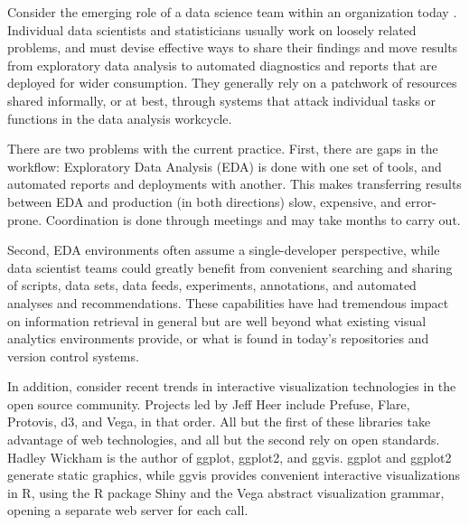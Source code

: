

\maketitle


Consider the emerging role of a data science team within an
organization today \cite{Keim:2008:VAS}.
%
Individual data scientists and statisticians usually work on loosely
related problems, and must devise effective ways to share their findings
and move results from exploratory data analysis to automated diagnostics
and reports that are deployed for wider consumption.
They generally rely on a patchwork of resources shared informally,
or at best, through systems that attack individual tasks or functions
in the data analysis workcycle. %

There are two problems with the current practice. First, there are
gaps in the workflow: Exploratory Data Analysis (EDA) is done with one
set of tools, and automated reports and deployments with another. This
makes transferring results between EDA and production (in both
directions) slow, expensive, and error-prone. Coordination is done
through meetings and may take months to carry out.

Second, EDA environments often assume a single-developer perspective,
while data scientist teams could greatly benefit from convenient searching
and sharing of scripts, data sets, data feeds, experiments, annotations,
and automated analyses and recommendations. These capabilities have had
tremendous impact on information retrieval in general but are well
beyond what existing visual analytics environments provide, or what
is found in today's repositories and version control
systems.\cite{Koren:2009:FIT}

In addition, consider recent trends in interactive visualization
technologies in the open source community. Projects led by Jeff Heer
include Prefuse, Flare, Protovis, d3, and Vega, in that order.
All but the first of these libraries take advantage of web technologies,
and all but the second rely on open standards. Hadley Wickham is the
author of ggplot, ggplot2, and ggvis. ggplot and ggplot2 generate
static graphics, while ggvis provides convenient interactive visualizations
in R, using the R package Shiny and the Vega abstract visualization grammar,
opening a separate web server for each call.

